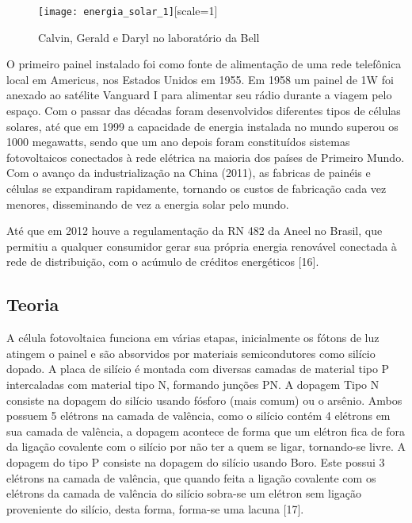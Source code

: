 \begin{figure}[ht!]
	\centering
	\caption{Calvin, Gerald e Daryl no laboratório da Bell}
	\label{fig:energia_solar_1}
	\texttt{[image: energia\_solar\_1]}[scale=1]
\end{figure}

O primeiro painel instalado foi como fonte de alimentação de uma rede telefônica local em Americus, nos Estados Unidos em 1955. Em 1958 um painel de 1W foi anexado ao satélite Vanguard I para alimentar seu rádio durante a viagem pelo espaço. Com o passar das décadas foram desenvolvidos diferentes tipos de células solares, até que em 1999 a capacidade de energia instalada no mundo superou os 1000 megawatts, sendo que um ano depois foram constituídos sistemas fotovoltaicos conectados à rede elétrica na maioria dos países de Primeiro Mundo. Com o avanço da industrialização na China (2011), as fabricas de painéis e células se expandiram rapidamente, tornando os custos de fabricação cada vez menores, disseminando de vez a energia solar pelo mundo.

Até que em 2012 houve a regulamentação da RN 482 da Aneel no Brasil, que permitiu a qualquer consumidor gerar sua própria energia renovável conectada à rede de distribuição, com o acúmulo de créditos energéticos [16].

\subsection{Teoria}

A célula fotovoltaica funciona em várias etapas, inicialmente os fótons de luz atingem o painel e são absorvidos por materiais semicondutores como silício dopado. A placa de silício é montada com diversas camadas de material tipo P intercaladas com material tipo N, formando junções PN. A dopagem Tipo N consiste na dopagem do silício usando fósforo (mais comum) ou o arsênio. Ambos possuem 5 elétrons na camada de valência, como o silício contém 4 elétrons em sua camada de valência, a dopagem acontece de forma que um elétron fica de fora da ligação covalente com o silício por não ter a quem se ligar, tornando-se livre. A dopagem do tipo P consiste na dopagem do silício usando Boro. Este possui 3 elétrons na camada de valência, que quando feita a ligação covalente com os elétrons da camada de valência do silício sobra-se um elétron sem ligação proveniente do silício, desta forma, forma-se uma lacuna [17].

